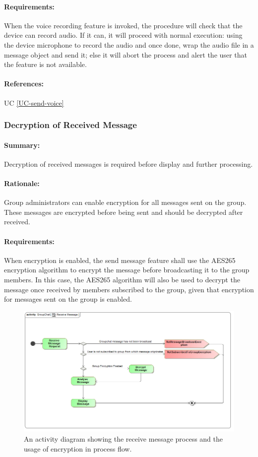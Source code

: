 \documentclass[11pt]{article}
\begin{document}
\paragraph{Requirements:} When the voice recording feature is invoked, the procedure will check that the device can record audio. If it can, it will proceed with normal execution: using the device microphone to record the audio and once done, wrap the audio file in a message object and send it; else it will abort the process and alert the user that the feature is not available.
\paragraph{References:} UC \ref{UC-send-voice}

\subsubsection{Decryption of Received Message} \label{FR-decrypt-received-message}
\paragraph{Summary:} Decryption of received messages is required before display and further processing.
\paragraph{Rationale:} Group administrators can enable encryption for all messages sent on the group. These messages are encrypted before being sent and should be decrypted after received.
\paragraph{Requirements:} When encryption is enabled, the send message feature shall use the AES265 encryption algorithm to encrypt the message before broadcasting it to the group members. In this case, the AES265 algorithm will also be used to decrypt the message once received by members subscribed to the group, given that encryption for messages sent on the group is enabled.
\begin{figure}[H]
\centering
\includegraphics[width=5in]{./images/Activity_Receive_Message.png}
\caption[Receive Message Activity Diagram]{An activity diagram showing the receive message process and the  usage of encryption in process flow.}
\label{FR-figure-activity-receive-message}
\end{figure}
\end{document}
